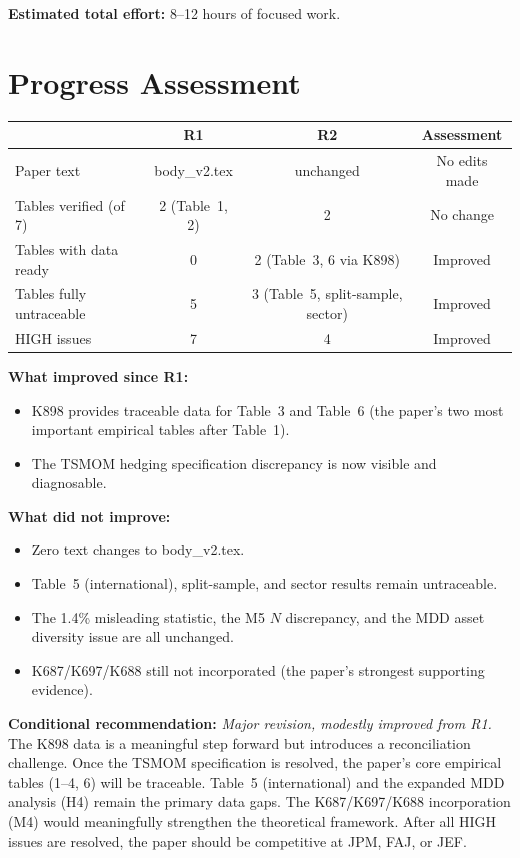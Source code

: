 \documentclass[12pt,a4paper]{article}
\begin{document}
\bigskip
\noindent\textbf{Estimated total effort:} 8--12 hours of focused work.


\section{Progress Assessment}
\label{sec:progress}

\begin{center}
\begin{tabular}{lccc}
\toprule
& R1 & R2 & Assessment \\
\midrule
Paper text & body\_v2.tex & unchanged & No edits made \\
Tables verified (of 7) & 2 (Table~1, 2) & 2 & No change \\
Tables with data ready & 0 & 2 (Table~3, 6 via K898) & Improved \\
Tables fully untraceable & 5 & 3 (Table~5, split-sample, sector) & Improved \\
HIGH issues & 7 & 4 & Improved \\
\bottomrule
\end{tabular}
\end{center}

\noindent\textbf{What improved since R1:}
\begin{itemize}[nosep]
\item K898 provides traceable data for Table~3 and Table~6 (the paper's two most important empirical tables after Table~1).
\item The TSMOM hedging specification discrepancy is now visible and diagnosable.
\end{itemize}

\noindent\textbf{What did not improve:}
\begin{itemize}[nosep]
\item Zero text changes to body\_v2.tex.
\item Table~5 (international), split-sample, and sector results remain untraceable.
\item The 1.4\% misleading statistic, the M5 $N$ discrepancy, and the MDD asset diversity issue are all unchanged.
\item K687/K697/K688 still not incorporated (the paper's strongest supporting evidence).
\end{itemize}

\bigskip

\noindent\textbf{Conditional recommendation:} \textit{Major revision, modestly improved from R1.} The K898 data is a meaningful step forward but introduces a reconciliation challenge. Once the TSMOM specification is resolved, the paper's core empirical tables (1--4, 6) will be traceable. Table~5 (international) and the expanded MDD analysis (H4) remain the primary data gaps. The K687/K697/K688 incorporation (M4) would meaningfully strengthen the theoretical framework. After all HIGH issues are resolved, the paper should be competitive at JPM, FAJ, or JEF.
\end{document}
